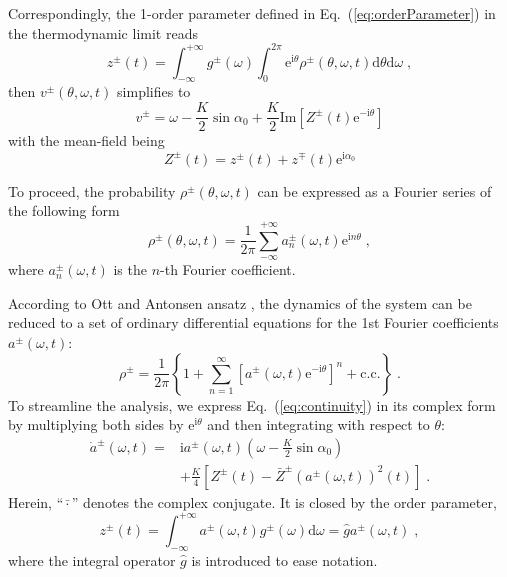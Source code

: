 \documentclass{article}
\begin{document}
Correspondingly, the 1-order parameter defined in Eq.~(\ref{eq:orderParameter}) in the thermodynamic limit reads
\begin{equation}
    \label{eq:continuityZ}
    z^{\pm}\left( t \right) =\int_{-\infty}^{+\infty}{g^{\pm}(\omega)\int_0^{2\pi}{\text{e}^{\text{i}\theta}\rho ^{\pm}\left( \theta ,\omega ,t \right) \text{d}\theta \text{d}\omega}}\;,
\end{equation}
then $v^{\pm}\left( \theta ,\omega ,t \right)$ simplifies to
\begin{equation}
v^{\pm}=\omega -\frac{K}{2}\sin \alpha _0+\frac{K}{2}\mathrm{Im}\left[ Z^{\pm}\left( t \right) \mathrm{e}^{-\mathrm{i}\theta} \right] 
\end{equation}
with the mean-field being
\begin{equation}
    Z^{\pm}\left( t \right) =z^{\pm}\left( t \right) +z^{\mp}\left( t \right) \mathrm{e}^{\mathrm{i}\alpha _0}
\end{equation}

To proceed, the probability $\rho ^{\pm}\left( \theta ,\omega ,t \right)$ can be expressed as a Fourier series of the following form
\begin{equation}
    \rho ^{\pm}\left( \theta ,\omega ,t \right) =\frac{1}{2\pi}\sum_{-\infty}^{+\infty}{a^{\pm} _n\left( \omega ,t \right) \mathrm{e}^{\mathrm{i}n\theta}}\;,
\end{equation}
where $a^{\pm} _n\left( \omega ,t \right)$ is the $n$-th Fourier coefficient.

According to Ott and Antonsen ansatz \cite{10.1063/1.2930766, 10.1063/1.3136851}, the dynamics of the system can be reduced to a set of ordinary differential equations for the 1st Fourier coefficients $a^{\pm}\left( \omega ,t \right)$:
\begin{equation}
    \rho ^{\pm}=\frac{1}{2\pi}\left\{ 1+\sum_{n=1}^{\infty}{\left[ a^{\pm} \left( \omega ,t \right) \mathrm{e}^{-\mathrm{i}\theta} \right] ^n+\mathrm{c}.\mathrm{c}.} \right\} \;.
\end{equation}
To streamline the analysis, we express Eq.~(\ref{eq:continuity}) in its complex form by multiplying both sides by $\mathrm{e}^{\mathrm{i}\theta}$ and then integrating with respect to $\theta$:
\begin{equation}
    \label{eq:aDynamics}
    \begin{aligned}
        \dot{a}^{\pm}\left( \omega ,t \right) =&\mathrm{i}a^{\pm}\left( \omega ,t \right) \left( \omega -\frac{K}{2}\sin \alpha _0 \right)\\
        &+\frac{K}{4}\left[ Z^{\pm}\left( t \right) -\bar{Z}^{\pm}\left( a^{\pm}\left( \omega ,t \right) \right) ^2\left( t \right) \right] \;.
    \end{aligned}
\end{equation}
Herein, \enquote{$\bar{\cdot}$} denotes the complex conjugate.
It is closed by the order parameter,
\begin{equation}
    \label{eq:zEqs2a}
    z^{\pm}\left( t \right) =\int_{-\infty}^{+\infty}{a^{\pm}\left( \omega ,t \right) g^{\pm}\left( \omega \right) \mathrm{d}\omega =}\hat{g}a^{\pm} \left( \omega ,t \right)\;,
\end{equation}
where the integral operator $\hat{g}$ is introduced to ease notation.
\end{document}
